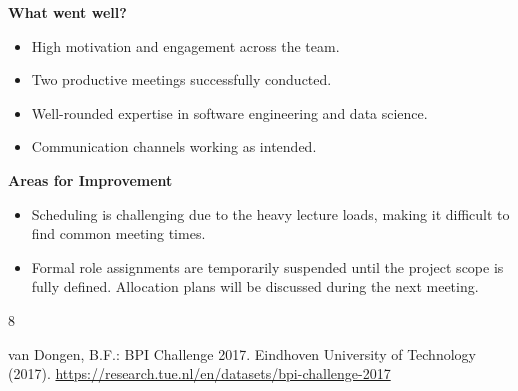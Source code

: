 \documentclass[runningheads]{llncs}
\begin{document}
\textbf{What went well?}
\begin{itemize}
    \item High motivation and engagement across the team.
    \item Two productive meetings successfully conducted.
    \item Well-rounded expertise in software engineering and data science.
    \item Communication channels working as intended.
\end{itemize}
\textbf{Areas for Improvement}
\begin{itemize}
    \item Scheduling is challenging due to the heavy lecture loads, making it difficult to find common meeting times.
    \item Formal role assignments are temporarily suspended until the project scope is fully defined. Allocation plans will be discussed during the next meeting.
\end{itemize}


\begin{thebibliography}{8}

    van Dongen, B.F.: BPI Challenge 2017. Eindhoven University of Technology (2017). \url{https://research.tue.nl/en/datasets/bpi-challenge-2017}



\end{thebibliography}
\end{document}
